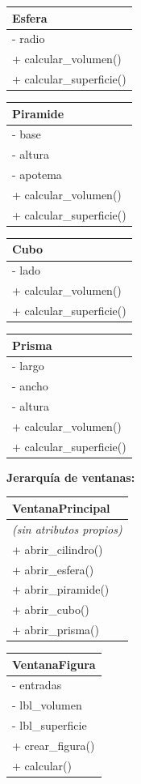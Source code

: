 \documentclass[11pt, a4paper]{article}
\newcommand{\clasebox}[3]{%
\begin{center}
\begin{tabular}{|l|}
\hline
\textbf{#1} \\
\hline
#2
\hline
#3
\hline
\end{tabular}
\end{center}
}
\begin{document}
\clasebox{Esfera}
{%
- radio \\
}
{%
+ calcular\_volumen() \\
+ calcular\_superficie() \\
}

\clasebox{Piramide}
{%
- base \\
- altura \\
- apotema \\
}
{%
+ calcular\_volumen() \\
+ calcular\_superficie() \\
}

\clasebox{Cubo}
{%
- lado \\
}
{%
+ calcular\_volumen() \\
+ calcular\_superficie() \\
}

\clasebox{Prisma}
{%
- largo \\
- ancho \\
- altura \\
}
{%
+ calcular\_volumen() \\
+ calcular\_superficie() \\
}

\newpage
\noindent \textbf{Jerarquía de ventanas:}

\clasebox{VentanaPrincipal}
{%
\textit{(sin atributos propios)} \\
}
{%
+ abrir\_cilindro() \\
+ abrir\_esfera() \\
+ abrir\_piramide() \\
+ abrir\_cubo() \\
+ abrir\_prisma() \\
}

\clasebox{VentanaFigura}
{%
- entradas \\
- lbl\_volumen \\
- lbl\_superficie \\
}
{%
+ crear\_figura() \\
+ calcular() \\
}
\end{document}
